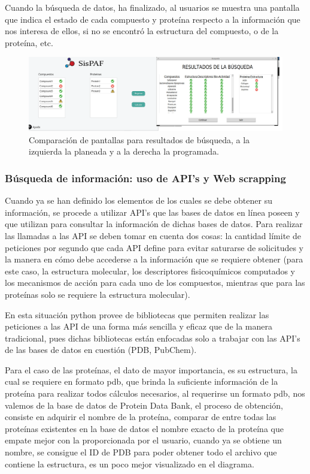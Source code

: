 \noindent Cuando la búsqueda de datos, ha finalizado, al usuarios se muestra una pantalla que indica el estado de cada compuesto y proteína respecto a la información que nos interesa de ellos, si no se encontró la estructura del compuesto, o de la proteína, etc.

\begin{figure}[H]
    \centering
    \includegraphics[scale=0.225]{Capitulo4/Documentos/imagenes_generacion/ResultBusqueda.png}
    \caption{Comparación de pantallas para resultados de búsqueda, a la izquierda la planeada y a la derecha la programada.}
    \label{comparacion_5}
\end{figure}
\subsubsection{Búsqueda de información: uso de API’s y Web scrapping}
\noindent Cuando ya se han definido los elementos de los cuales se debe obtener su información, se procede a utilizar API’s que las bases de datos en línea poseen y que utilizan para consultar la información de dichas bases de datos. Para realizar las llamadas a las API se deben tomar en cuenta dos cosas: la cantidad límite de peticiones por segundo que cada API define para evitar saturarse de solicitudes y la manera en cómo debe accederse a la información que se requiere obtener (para este caso, la estructura molecular, los descriptores fisicoquímicos computados y los mecanismos de acción para cada uno de los  compuestos, mientras que para las proteínas solo se requiere la estructura molecular).

\noindent En esta situación python provee de bibliotecas que permiten realizar las peticiones a las API de una forma más sencilla y eficaz que de la manera tradicional, pues dichas bibliotecas están enfocadas solo a trabajar con las API’s de las bases de datos en cuestión (PDB, PubChem).

\noindent Para el caso de las proteínas, el dato de mayor importancia, es su estructura, la cual se requiere en formato pdb, que brinda la suficiente información de la proteína para realizar todos cálculos necesarios,  al requerirse un formato pdb, nos valemos de la base de datos de Protein Data Bank, el proceso de obtención, consiste en adquirir el nombre de la proteína, comparar de entre todas las proteínas existentes en la base de datos el nombre exacto de la proteína que empate mejor con la proporcionada por el usuario, cuando ya se obtiene un nombre, se consigue el ID de PDB para poder obtener todo el archivo que contiene la estructura, es un poco mejor visualizado en el diagrama.\\


